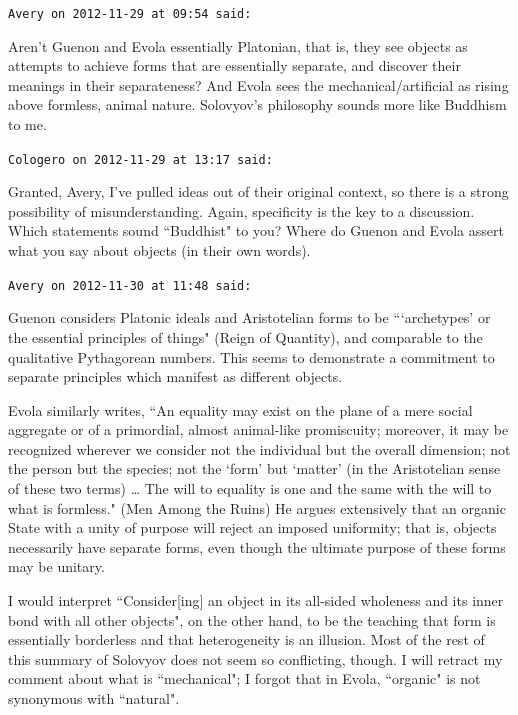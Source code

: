 \begin{footnotesize}\begin{sffamily}



\texttt{Avery on 2012-11-29 at 09:54 said: }

Aren't Guenon and Evola essentially Platonian, that is, they see objects as attempts to achieve forms that are essentially separate, and discover their meanings in their separateness? And Evola sees the mechanical/artificial as rising above formless, animal nature. Solovyov's philosophy sounds more like Buddhism to me.


\hfill

\texttt{Cologero on 2012-11-29 at 13:17 said: }

Granted, Avery, I've pulled ideas out of their original context, so there is a strong possibility of misunderstanding. Again, specificity is the key to a discussion. Which statements sound ``Buddhist" to you? Where do Guenon and Evola assert what you say about objects (in their own words).


\hfill

\texttt{Avery on 2012-11-30 at 11:48 said: }

Guenon considers Platonic ideals and Aristotelian forms to be ```archetypes' or the essential principles of things" (Reign of Quantity), and comparable to the qualitative Pythagorean numbers. This seems to demonstrate a commitment to separate principles which manifest as different objects.

Evola similarly writes, ``An equality may exist on the plane of a mere social aggregate or of a primordial, almost animal-like promiscuity; moreover, it may be recognized wherever we consider not the individual but the overall dimension; not the person but the species; not the `form' but `matter' (in the Aristotelian sense of these two terms) … The will to equality is one and the same with the will to what is formless." (Men Among the Ruins) He argues extensively that an organic State with a unity of purpose will reject an imposed uniformity; that is, objects necessarily have separate forms, even though the ultimate purpose of these forms may be unitary.

I would interpret ``Consider[ing] an object in its all-sided wholeness and its inner bond with all other objects", on the other hand, to be the teaching that form is essentially borderless and that heterogeneity is an illusion. Most of the rest of this summary of Solovyov does not seem so conflicting, though. I will retract my comment about what is ``mechanical"; I forgot that in Evola, ``organic" is not synonymous with ``natural".



\end{sffamily}
\end{footnotesize}
